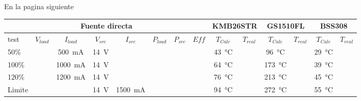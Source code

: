 
En la pagina siguiente

\begin{landscape}
    \begin{table}[H]
        \centering
        \renewcommand\theadfont{\bfseries}
        \setlength{\tabcolsep}{10pt}
        \renewcommand{\arraystretch}{1.5}
        \begin{tabular}{|l|c|c|c|c|c|c|c|c|c|c|c|c|c|}
            \hline
            \multicolumn{8}{|c|}{Fuente directa}    & \multicolumn{2}{|c|}{KMB26STR} & \multicolumn{2}{|c|}{GS1510FL} & \multicolumn{2}{|c|}{BSS308}                                                                                                                                                                   \\ \hline
            test                                    & $V_{load}$                     & $I_{load}$                     & $V_{src}$                      & $I_{src}$                & $P_{load}$ & $P_{src}$ & $Eff$ & $T_{Calc}$        & $T_{real}$ & $T_{Calc}$         & $T_{real}$ & $T_{Calc}$        & $T_{real}$ \\ \hline
            50\%                                    &                                & \SI{500}{\milli\ampere}        & \SI{14}{\volt}                 &                          &            &           &       & \SI{43}{\celsius} &            & \SI{96}{\celsius}  &            & \SI{29}{\celsius} &            \\ \hline
            100\%                                   &                                & \SI{1000}{\milli\ampere}       & \SI{14}{\volt}                 &                          &            &           &       & \SI{64}{\celsius} &            & \SI{173}{\celsius} &            & \SI{39}{\celsius} &            \\ \hline
            120\%                                   &                                & \SI{1200}{\milli\ampere}       & \SI{14}{\volt}                 &                          &            &           &       & \SI{76}{\celsius} &            & \SI{213}{\celsius} &            & \SI{45}{\celsius} &            \\ \hline
            Limite                                  &                                &                                & \SI{14}{\volt}                 & \SI{1500}{\milli\ampere} &            &           &       & \SI{94}{\celsius} &            & \SI{272}{\celsius} &            & \SI{55}{\celsius} &            \\
            \hline


\end{tabular}
\end{table}
\end{landscape}
